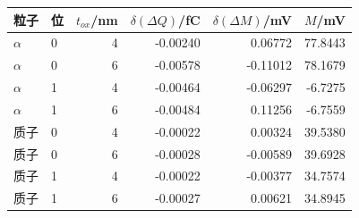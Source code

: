 \begin{tabular}{llrrrr}
\toprule
粒子 & 位 & $t_{ox}$/nm & $\delta(\Delta Q)$/fC & $\delta(\Delta M)$/mV & $M$/mV\\
\midrule
$\alpha$ & 0 & 4 & -0.00240 & 0.06772 & 77.8443\\
$\alpha$ & 0 & 6 & -0.00578 & -0.11012 & 78.1679\\
$\alpha$ & 1 & 4 & -0.00464 & -0.06297 & -6.7275\\
$\alpha$ & 1 & 6 & -0.00484 & 0.11256 & -6.7559\\
质子 & 0 & 4 & -0.00022 & 0.00324 & 39.5380\\
质子 & 0 & 6 & -0.00028 & -0.00589 & 39.6928\\
质子 & 1 & 4 & -0.00022 & -0.00377 & 34.7574\\
质子 & 1 & 6 & -0.00027 & 0.00621 & 34.8945\\
\bottomrule
\end{tabular}
